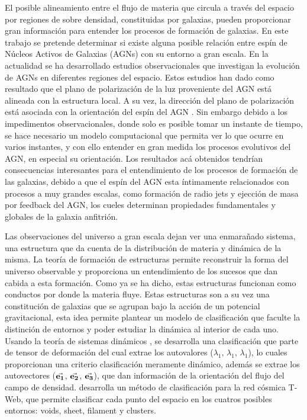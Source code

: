 El posible alineamiento entre el flujo de materia que circula a través del espacio por regiones de sobre densidad, constituidas por galaxias, pueden proporcionar gran información para entender los procesos de formación de galaxias. En este trabajo se pretende determinar si existe alguna posible relación entre espín de Núcleos Activos de Galaxias (AGNs) con su entorno a gran escala. En la actualidad se ha desarrollado estudios observacionales que investigan la evolución de AGNs en diferentes regiones del espacio. Estos estudios han dado como resultado que el plano de polarización de la luz proveniente del AGN está alineada con la estructura local. A su vez, la dirección del plano de polarización está asociada con la orientación del espín del AGN \cite{hutsemekers2014}. Sin embargo debido a los impedimentos observacionales, donde solo es posible tomar un instante de tiempo, se hace necesario un modelo computacional que permita ver lo que ocurre en varios instantes, y con ello entender en gran medida los procesos evolutivos del AGN, en especial su orientación. Los resultados acá obtenidos tendrían consecuencias interesantes para el entendimiento de los procesos de formación de las galaxias, debido a que el espín del AGN esta íntimamente relacionados con procesos a muy grandes escalas, como formación de radio jets y ejección de masa por feedback del AGN, los cueles determinan propiedades fundamentales y globales de la galaxia anfitrión. 


Las observaciones del universo a gran escala dejan ver una enmarañado sistema, una estructura que da cuenta de la distribución de materia y dinámica de la misma. La teoría de formación de estructuras \cite{zeldovich1970} permite reconstruir la forma del universo observable y proporciona un entendimiento de los sucesos que dan cabida a esta formación. Como ya se ha dicho, estas estructuras funcionan como conductos por donde la materia fluye. Estas estructuras son a su vez una constitución de galaxias que se agrupan bajo la acción de un potencial gravitacional, esta idea permite plantear un modelo de clasificación que faculte la distinción de entornos y poder estudiar la dinámica al interior de cada uno. Usando la teoría de sistemas dinámicos \cite{hahn2007}, se desarrolla una clasificación que parte de tensor de deformación del cual extrae los autovalores ($\lambda_{1}, \, \lambda_{1}, \, \lambda_{1}$), lo cuales proporcionan una criterio clasificación meramente dinámico, además se extrae los autovectores ($\vec{\bf{e_1}}$, $\vec{\bf{e_2}}$, $\vec{\bf{e_3}}$), que dan información de la orientación del flujo del campo de densidad. \cite{forero2009} desarrolla un método de clasificación para la red cósmica T-Web, que permite clasificar cada punto del espacio en los cuatros posibles entornos: voids, sheet, filament y clusters. 

